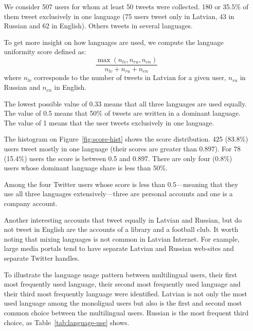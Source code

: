 \documentclass[11pt,a4paper]{article}
\begin{document}
We consider 507 users for whom at least 50 tweets were collected. 180 or 35.5\% of them tweet exclusively in one language (75 users tweet only in Latvian, 43 in Russian and 62 in English). Others tweets in several languages.

To get more insight on how languages are used, we compute the language uniformity score defined as:
\begin{equation}
  \label{eq:score}
  \frac{\max(n_\mathit{lv}, n_\mathit{ru}, n_\mathit{en})}{n_\mathit{lv} + n_\mathit{ru} + n_\mathit{en}}
\end{equation}
where $n_\mathit{lv}$ corresponds to the number of tweets in Latvian for a given user, $n_\mathit{ru}$ in Russian and $n_\mathit{en}$ in English.

The lowest possible value of 0.33 means that all three languages are used equally. The value of 0.5 means that 50\% of tweets are written in a dominant language. The value of 1 means that the user tweets exclusively in one language.

The histogram on Figure~\ref{fig:score-hist} shows the score distribution. 425 (83.8\%) users tweet mostly in one language (their scores are greater than 0.897). For 78  (15.4\%) users the score is between 0.5 and 0.897. There are only four (0.8\%) users whose dominant language share is less than 50\%.

Among the four Twitter users whose score is less than 0.5---meaning that they use all three languages extensively---three are personal accounts and one is a company account.

Another interesting accounts that tweet equally in Latvian and Russian, but do not tweet in English are the accounts of a library and a football club. It worth noting that mixing languages is not common in Latvian Internet. For example, large media portals tend to have separate Latvian and Russian web-sites and separate Twitter handles.

To illustrate the language usage pattern between multilingual users, their first most frequently used language, their second most frequently used language and their third most frequently language were identified. Latvian is not only the most used language among the monoligual users but also is the first and second most common choice between the multilingual users. Russian is the most frequent third choice, as Table~\ref{tab:language-use} shows.


\end{document}

